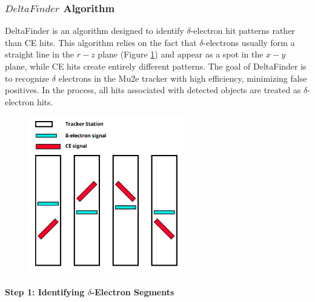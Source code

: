 \subsubsection{$DeltaFinder$ Algorithm}
DeltaFinder is an algorithm designed to identify $\delta$-electron hit patterns 
rather than CE hits. This algorithm relies on the fact that $\delta$-electrons usually 
form a straight line in the $r-z$ plane (Figure \ref{fig:yzviewdelta}) and appear as a spot in the $x-y$ plane, 
while CE hits create entirely different patterns. The goal of DeltaFinder is to recognize 
$\delta$ electrons in the Mu2e tracker with high efficiency, minimizing false positives. 
In the process, all hits associated with detected objects are treated as $\delta$-electron hits.
\begin{figure}[!h]
    \centering
    \includegraphics[width =0.6\textwidth]{figures/png/Screenshot_20240811_123048.png}
    \caption[$\delta$-electrons $y-z$ plane pattern.]{    }
    \label{fig:yzviewdelta}
\end{figure}
\paragraph{Step 1: Identifying $\delta$-Electron Segments}

